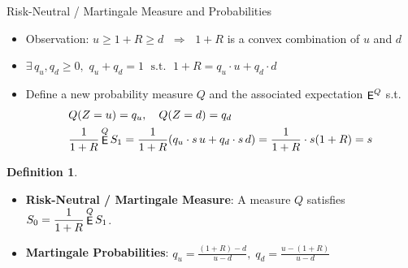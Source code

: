 \documentclass[10pt,handout]{beamer}
\newcommand{\ds}{\displaystyle}
\newcommand{\ie}{\;\Longrightarrow\;}
\newcommand{\ifff}{\;\Longleftrightarrow\;}
\DeclareMathOperator\expc{{\sf E}}
\theoremstyle{definition}
\newtheorem*{dfn}{Definition}
\newtheorem*{thm}{Theorem}
\begin{document}

\begin{frame}{Risk-Neutral / Martingale Measure and Probabilities}
  \begin{itemize}
    \item Observation: $u\geqslant 1+R \geqslant d$ $\ie$ $1 + R$ is a convex combination of $u$ and $d$  
    \item $\ds\exists\,q_u, q_d \geqslant 0,\,\,q_u+q_d = 1\;\text{ s.t. }\; 1 + R = q_u\cdot u + q_d\cdot d$
    \item Define a new probability measure $Q$ and the associated expectation $\expc^Q$ s.t. 
      \begin{align*}
        &Q(Z = u) = q_u,\quad Q(Z = d) = q_d \\
        &\frac{1}{1+R}\expc^Q S_1 = \frac{1}{1+R}(q_u\cdot s\,u + q_d\cdot s\,d) = \frac{1}{1+R}\cdot s(1+R) = s
      \end{align*}
  \end{itemize}
  \begin{dfn}
    \begin{itemize}
      \item \textbf{Risk-Neutral / Martingale Measure}: A measure $Q$ satisfies $\ds S_0 = \frac{1}{1+R}\expc^Q S_1$.
      \item \textbf{Martingale Probabilities}: $\ds q_u = \frac{(1+R)-d}{u-d}, \;q_d = \frac{u-(1+R)}{u-d}$
    \end{itemize}
  \end{dfn}
\end{frame}
\end{document}
